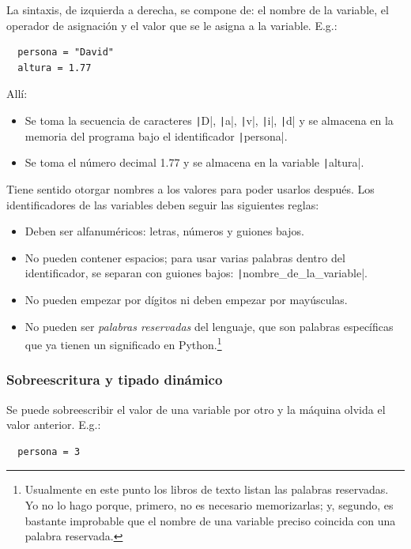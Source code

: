 La sintaxis, de izquierda a derecha, se compone de: el nombre de la variable, el operador de asignación y el valor que se le asigna a la variable. E.g.:

\begin{verbatim}
  persona = "David"
  altura = 1.77
\end{verbatim}

Allí:
\begin{itemize}
  \item Se toma la secuencia de caracteres \texttt|D|, \texttt|a|, \texttt|v|, \texttt|i|, \texttt|d| y se almacena en la memoria del programa bajo el identificador \texttt|persona|.
  \item Se toma el número decimal 1.77 y se almacena en la variable \texttt|altura|.
\end{itemize}

Tiene sentido otorgar nombres a los valores para poder usarlos después. Los identificadores de las variables deben seguir las siguientes reglas:
\begin{itemize}
  \item Deben ser alfanuméricos: letras, números y guiones bajos.
  \item No pueden contener espacios; para usar varias palabras dentro del identificador, se separan con guiones bajos: \texttt|nombre_de_la_variable|.
  \item No pueden empezar por dígitos ni deben empezar por mayúsculas.
  \item No pueden ser \emph{palabras reservadas} del lenguaje, que son palabras específicas que ya tienen un significado en Python.\footnote{Usualmente en este punto los libros de texto listan las palabras reservadas. Yo no lo hago porque, primero, no es necesario memorizarlas; y, segundo, es bastante improbable que el nombre de una variable preciso coincida con una palabra reservada.}
\end{itemize}

\subsubsection{Sobreescritura y tipado dinámico}

Se puede sobreescribir el valor de una variable por otro y la máquina olvida el valor anterior. E.g.:

\begin{verbatim}
  persona = 3
\end{verbatim}

